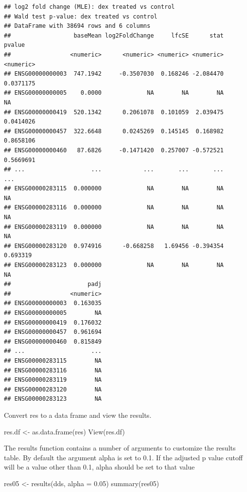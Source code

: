 \documentclass[
]{article}
\newenvironment{Shaded}{\begin{snugshade}}{\end{snugshade}}
\newcommand{\AttributeTok}[1]{\textcolor[rgb]{0.77,0.63,0.00}{#1}}
\newcommand{\FloatTok}[1]{\textcolor[rgb]{0.00,0.00,0.81}{#1}}
\newcommand{\FunctionTok}[1]{\textcolor[rgb]{0.00,0.00,0.00}{#1}}
\newcommand{\NormalTok}[1]{#1}
\newcommand{\OtherTok}[1]{\textcolor[rgb]{0.56,0.35,0.01}{#1}}
\begin{document}
\begin{verbatim}
## log2 fold change (MLE): dex treated vs control 
## Wald test p-value: dex treated vs control 
## DataFrame with 38694 rows and 6 columns
##                  baseMean log2FoldChange     lfcSE      stat    pvalue
##                 <numeric>      <numeric> <numeric> <numeric> <numeric>
## ENSG00000000003  747.1942     -0.3507030  0.168246 -2.084470 0.0371175
## ENSG00000000005    0.0000             NA        NA        NA        NA
## ENSG00000000419  520.1342      0.2061078  0.101059  2.039475 0.0414026
## ENSG00000000457  322.6648      0.0245269  0.145145  0.168982 0.8658106
## ENSG00000000460   87.6826     -0.1471420  0.257007 -0.572521 0.5669691
## ...                   ...            ...       ...       ...       ...
## ENSG00000283115  0.000000             NA        NA        NA        NA
## ENSG00000283116  0.000000             NA        NA        NA        NA
## ENSG00000283119  0.000000             NA        NA        NA        NA
## ENSG00000283120  0.974916      -0.668258   1.69456 -0.394354  0.693319
## ENSG00000283123  0.000000             NA        NA        NA        NA
##                      padj
##                 <numeric>
## ENSG00000000003  0.163035
## ENSG00000000005        NA
## ENSG00000000419  0.176032
## ENSG00000000457  0.961694
## ENSG00000000460  0.815849
## ...                   ...
## ENSG00000283115        NA
## ENSG00000283116        NA
## ENSG00000283119        NA
## ENSG00000283120        NA
## ENSG00000283123        NA
\end{verbatim}

Convert res to a data frame and view the results.

\begin{Shaded}
\begin{Highlighting}[]
\NormalTok{res.df }\OtherTok{\textless{}{-}} \FunctionTok{as.data.frame}\NormalTok{(res)}
\FunctionTok{View}\NormalTok{(res.df)}
\end{Highlighting}
\end{Shaded}

The results function contains a number of arguments to customize the
results table. By default the argument alpha is set to 0.1. If the
adjusted p value cutoff will be a value other than 0.1, alpha should be
set to that value

\begin{Shaded}
\begin{Highlighting}[]
\NormalTok{res05 }\OtherTok{\textless{}{-}} \FunctionTok{results}\NormalTok{(dds, }\AttributeTok{alpha =} \FloatTok{0.05}\NormalTok{)}
\FunctionTok{summary}\NormalTok{(res05)}
\end{Highlighting}
\end{Shaded}
\end{document}
